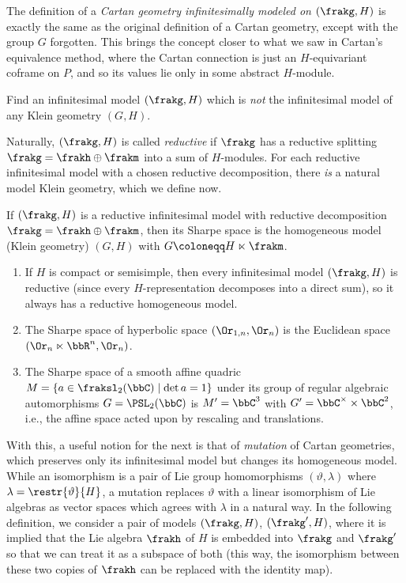 The definition of a \emph{Cartan geometry infinitesimally modeled on $(\frakg,H)$} is exactly the same as the original definition of a Cartan geometry, except with the group $G$ forgotten. This brings the concept closer to what we saw in Cartan's equivalence method, where the Cartan connection is just an $H$-equivariant coframe on $P$, and so its values lie only in some abstract $H$-module.

\begin{xca}
    Find an infinitesimal model $(\frakg,H)$ which is \emph{not} the infinitesimal model of any Klein geometry $(G,H)$.
\end{xca}

Naturally, $(\frakg,H)$ is called \emph{reductive} if $\frakg$ has a reductive splitting $\frakg=\frakh\oplus\frakm$ into a sum of $H$-modules. For each reductive infinitesimal model with a chosen reductive decomposition, there \emph{is} a natural model Klein geometry, which we define now.

\begin{defn}
    If $(\frakg,H)$ is a reductive infinitesimal model with reductive decomposition $\frakg=\frakh\oplus\frakm$, then its Sharpe space is the homogeneous model (Klein geometry) $(G,H)$ with $G\coloneqq H\ltimes\frakm$.
\end{defn}

\begin{example}
    \begin{enumerate}
        \item If $H$ is compact or semisimple, then every infinitesimal model $(\frakg,H)$ is reductive (since every $H$-representation decomposes into a direct sum), so it always has a reductive homogeneous model.
        \item The Sharpe space of hyperbolic space $(\Or_{1,n},\Or_n)$ is the Euclidean space $(\Or_{n}\ltimes\bbR^n,\Or_n)$.
        \item The Sharpe space of a smooth affine quadric $M=\{a\in \fraksl_{2}(\bbC)\mid \det a=1\}$ under its group of regular algebraic automorphisms $G=\PSL_2(\bbC)$ is $M'=\bbC^3$ with $G'=\bbC^\times\times\bbC^2$, i.e., the affine space acted upon by rescaling and translations.
    \end{enumerate}
\end{example}


With this, a useful notion for the next \sect is that of \emph{mutation} of Cartan geometries, which preserves only its infinitesimal model but changes its homogeneous model. While an isomorphism is a pair of Lie group homomorphisms $(\vartheta,\lambda)$ where $\lambda=\restr{\vartheta}{H}$, a mutation replaces $\vartheta$ with a linear isomorphism of Lie algebras as vector spaces which agrees with $\lambda$ in a natural way.  In the following definition, we consider a pair of models $(\frakg,H)$, $(\frakg',H)$, where it is implied that the Lie algebra $\frakh$ of $H$ is embedded into $\frakg$ and $\frakg'$ so that we can treat it as a subspace of both (this way, the isomorphism between these two copies of $\frakh$ can be replaced with the identity map).

